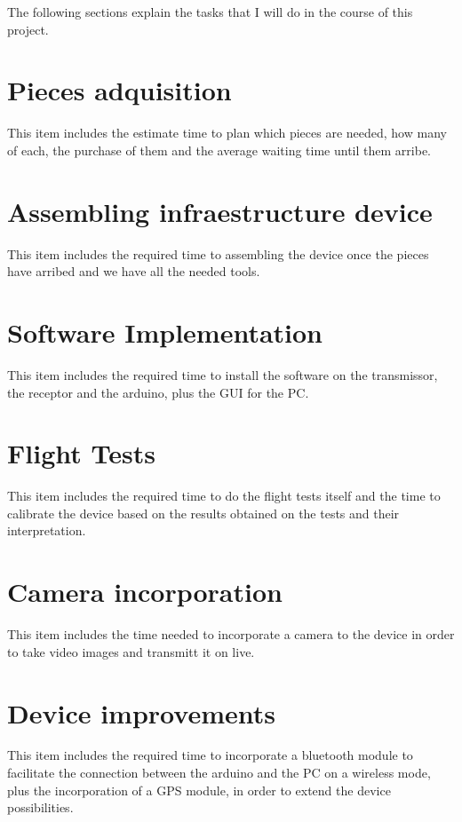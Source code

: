 \documentclass[12pt, a4paper,twoside]{tesi_upf}
\begin{document}
The following sections explain the tasks that I will do in the course of this project.

\section{Pieces adquisition}

This item includes the estimate time to plan which pieces are needed, how many of each, the purchase of them and the average waiting time until them arribe. 

\section{Assembling infraestructure device}

This item includes the required time to assembling the device once the pieces have arribed and we have all the needed tools.

\section{Software Implementation}

This item includes the required time to install the software on the transmissor, the receptor and the arduino, plus the GUI for the PC.

\section{Flight Tests}

This item includes the required time to do the flight tests itself and the time to calibrate the device based on the results obtained on the tests and their interpretation.

\section{Camera incorporation}

This item includes the time needed to incorporate a camera to the device in order to take video images and transmitt it on live.

\section{Device improvements}

This item includes the required time to incorporate a bluetooth module to facilitate the connection between the arduino and the PC on a wireless mode, plus the incorporation of a GPS module, in order to extend the device possibilities.
\end{document}
